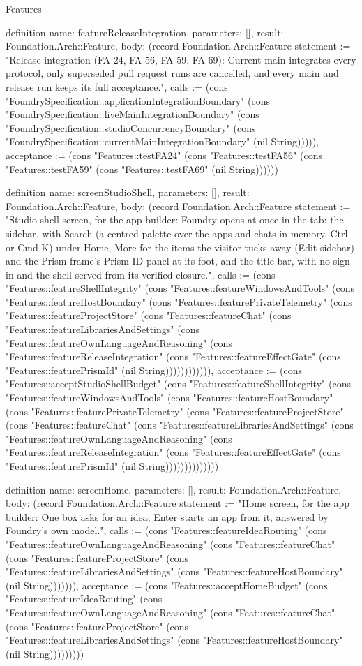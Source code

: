 \begin{lexlean}{Features}
\begin{semanticmodule}
definition{
  name: featureReleaseIntegration,
  parameters: [],
  result: Foundation.Arch::Feature,
  body: (record Foundation.Arch::Feature {statement := "Release integration (FA-24, FA-56, FA-59, FA-69): Current main integrates every protocol, only superseded pull request runs are cancelled, and every main and release run keeps its full acceptance.", calls := (cons "FoundrySpecification::applicationIntegrationBoundary" (cons "FoundrySpecification::liveMainIntegrationBoundary" (cons "FoundrySpecification::studioConcurrencyBoundary" (cons "FoundrySpecification::currentMainIntegrationBoundary" (nil String))))), acceptance := (cons "Features::testFA24" (cons "Features::testFA56" (cons "Features::testFA59" (cons "Features::testFA69" (nil String)))))})
}

definition{
  name: screenStudioShell,
  parameters: [],
  result: Foundation.Arch::Feature,
  body: (record Foundation.Arch::Feature {statement := "Studio shell screen, for the app builder: Foundry opens at once in the tab: the sidebar, with Search (a centred palette over the apps and chats in memory, Ctrl or Cmd K) under Home, More for the items the visitor tucks away (Edit sidebar) and the Prism frame's Prism ID panel at its foot, and the title bar, with no sign-in and the shell served from its verified closure.", calls := (cons "Features::featureShellIntegrity" (cons "Features::featureWindowsAndTools" (cons "Features::featureHostBoundary" (cons "Features::featurePrivateTelemetry" (cons "Features::featureProjectStore" (cons "Features::featureChat" (cons "Features::featureLibrariesAndSettings" (cons "Features::featureOwnLanguageAndReasoning" (cons "Features::featureReleaseIntegration" (cons "Features::featureEffectGate" (cons "Features::featurePrismId" (nil String)))))))))))), acceptance := (cons "Features::acceptStudioShellBudget" (cons "Features::featureShellIntegrity" (cons "Features::featureWindowsAndTools" (cons "Features::featureHostBoundary" (cons "Features::featurePrivateTelemetry" (cons "Features::featureProjectStore" (cons "Features::featureChat" (cons "Features::featureLibrariesAndSettings" (cons "Features::featureOwnLanguageAndReasoning" (cons "Features::featureReleaseIntegration" (cons "Features::featureEffectGate" (cons "Features::featurePrismId" (nil String)))))))))))))})
}

definition{
  name: screenHome,
  parameters: [],
  result: Foundation.Arch::Feature,
  body: (record Foundation.Arch::Feature {statement := "Home screen, for the app builder: One box asks for an idea; Enter starts an app from it, answered by Foundry's own model.", calls := (cons "Features::featureIdeaRouting" (cons "Features::featureOwnLanguageAndReasoning" (cons "Features::featureChat" (cons "Features::featureProjectStore" (cons "Features::featureLibrariesAndSettings" (cons "Features::featureHostBoundary" (nil String))))))), acceptance := (cons "Features::acceptHomeBudget" (cons "Features::featureIdeaRouting" (cons "Features::featureOwnLanguageAndReasoning" (cons "Features::featureChat" (cons "Features::featureProjectStore" (cons "Features::featureLibrariesAndSettings" (cons "Features::featureHostBoundary" (nil String))))))))})
}


\end{semanticmodule}
\end{lexlean}
